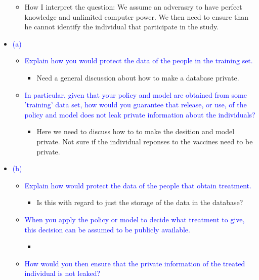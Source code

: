 \begin{itemize}
\begin{itemize}
            \item How I interpret the question: We assume an adverasry to have perfect knowledge and unlimited computer power. 
            We then need to ensure than he cannot identify the individual that participate in the study. 
        \end{itemize}
    \item \textcolor{blue}{(a)}
        \begin{itemize}
            \item \textcolor{blue}{Explain how you would protect the data of the people in the training set.}
                \begin{itemize}
                    \item Need a general discussion about how to make a database private.  
                \end{itemize}
            \item \textcolor{blue}{In particular, given that your policy and model are obtained from some 'training' data set, how would you guarantee that release, or use, of the policy and model does not leak private information about the individuals?}
                \begin{itemize}
                    \item Here we need to discuss how to to make the desition and model private. 
                    Not sure if the individual reponses to the vaccines need to be private. 
                \end{itemize}
        \end{itemize}
    \item \textcolor{blue}{(b)}
        \begin{itemize}
            \item \textcolor{blue}{Explain how would protect the data of the people that obtain treatment.}
                \begin{itemize}
                    \item Is this with regard to just the storage of the data in the database?
                \end{itemize}
            \item \textcolor{blue}{When you apply the policy or model to decide what treatment to give, this decision can be assumed to be publicly available.}
                \begin{itemize}
                    \item 
                \end{itemize}
            \item \textcolor{blue}{How would you then ensure that the private information of the treated individual is not leaked?}

\end{itemize}
\end{itemize}
